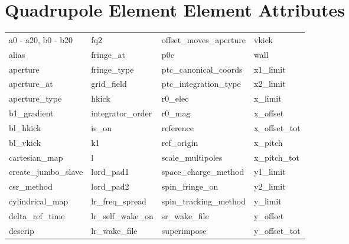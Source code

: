  \section{Quadrupole Element Element Attributes}
 \label{s:list.quadrupole}
 
 \begin{tabular}{llll} \toprule
a0 - a20, b0 - b20          & fq2                         & offset_moves_aperture       & vkick                       \\
alias                       & fringe_at                   & p0c                         & wall                        \\
aperture                    & fringe_type                 & ptc_canonical_coords        & x1_limit                    \\
aperture_at                 & grid_field                  & ptc_integration_type        & x2_limit                    \\
aperture_type               & hkick                       & r0_elec                     & x_limit                     \\
b1_gradient                 & integrator_order            & r0_mag                      & x_offset                    \\
bl_hkick                    & is_on                       & reference                   & x_offset_tot                \\
bl_vkick                    & k1                          & ref_origin                  & x_pitch                     \\
cartesian_map               & l                           & scale_multipoles            & x_pitch_tot                 \\
create_jumbo_slave          & lord_pad1                   & space_charge_method         & y1_limit                    \\
csr_method                  & lord_pad2                   & spin_fringe_on              & y2_limit                    \\
cylindrical_map             & lr_freq_spread              & spin_tracking_method        & y_limit                     \\
delta_ref_time              & lr_self_wake_on             & sr_wake_file                & y_offset                    \\
descrip                     & lr_wake_file                & superimpose                 & y_offset_tot                \\

\end{tabular}
